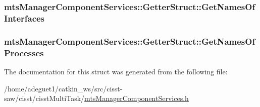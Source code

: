 \hypertarget{structmts_manager_component_services_1_1_getter_struct_a0783d016f0e0dc078a89769f2b66f334}{
\subsubsection[{Get\-Names\-Of\-Interfaces}]{ mts\-Manager\-Component\-Services\-::\-Getter\-Struct\-::\-Get\-Names\-Of\-Interfaces}}\label{structmts_manager_component_services_1_1_getter_struct_a0783d016f0e0dc078a89769f2b66f334}
\hypertarget{structmts_manager_component_services_1_1_getter_struct_a1873270501352f0f330b0d21f555956c}{
\subsubsection[{Get\-Names\-Of\-Processes}]{ mts\-Manager\-Component\-Services\-::\-Getter\-Struct\-::\-Get\-Names\-Of\-Processes}}\label{structmts_manager_component_services_1_1_getter_struct_a1873270501352f0f330b0d21f555956c}


The documentation for this struct was generated from the following file\-:\begin{DoxyCompactItemize}
\item 
/home/adeguet1/catkin\-\_\-ws/src/cisst-\/saw/cisst/cisst\-Multi\-Task/\hyperlink{mts_manager_component_services_8h}{mts\-Manager\-Component\-Services.\-h}\end{DoxyCompactItemize}

